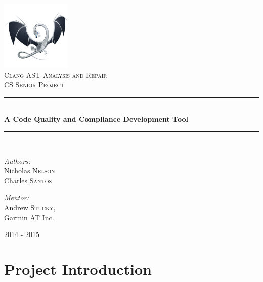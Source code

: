 \documentclass[11pt]{scrreprt}
\newcommand{\HRule}{\rule{\linewidth}{0.5mm}}
\begin{document}
\begin{titlepage}
\begin{center}

\includegraphics[width=0.25\textwidth]{clang_logo}~\\[1cm]

\textsc{\LARGE Clang AST Analysis and Repair}\\[1.5cm]

\textsc{\Large CS Senior Project}\\[0.5cm]

\HRule \\[0.4cm]
{ \huge \bfseries A Code Quality and Compliance Development Tool \\[0.4cm] }

\HRule \\[1.5cm]

\noindent
\begin{minipage}[t]{0.4\textwidth}
\begin{flushleft} \large
\emph{Authors:}\\
Nicholas \textsc{Nelson}\\
Charles \textsc{Santos}
\end{flushleft}
\end{minipage}%
\begin{minipage}[t]{0.4\textwidth}
\begin{flushright} \large
\emph{Mentor:} \\
Andrew \textsc{Stucky},\\
Garmin AT Inc.
\end{flushright}
\end{minipage}

\vfill

{\large 2014 - 2015}

\end{center}
\end{titlepage}

\tableofcontents

\chapter{Project Introduction}
\end{document}
